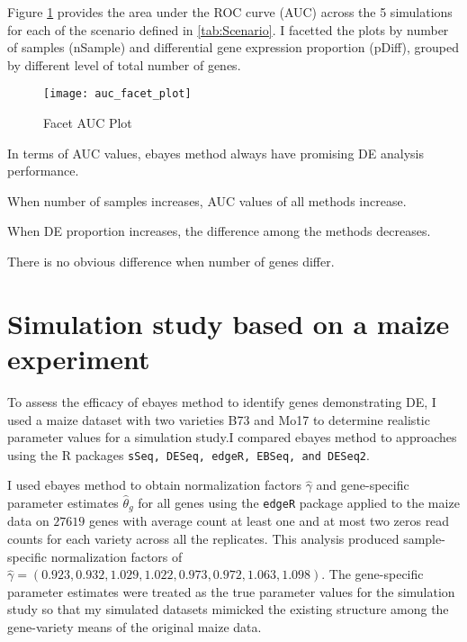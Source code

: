 Figure \ref{auc} provides the area under the ROC curve (AUC) across the 5 simulations for each of the scenario defined in \ref{tab:Scenario}. I facetted the plots by number of samples (nSample) and differential gene expression proportion (pDiff), grouped by different level of total number of genes. 

\begin{figure}[h!tb] 
\texttt{[image: auc\_facet\_plot]}
\caption{Facet AUC Plot}
\label{auc}
\end{figure}

In terms of AUC values, ebayes method always have promising DE analysis performance.

When number of samples increases, AUC values of all methods increase. 

When DE proportion increases, the difference among the methods decreases. 

There is no obvious difference when number of genes differ.











\section{Simulation study based on a maize experiment}

To assess the efficacy of ebayes method to identify genes demonstrating DE, I used a maize dataset with two varieties B73 and Mo17\citep{paschold2012complementation} to determine realistic parameter values for a simulation study.I compared ebayes method to approaches using the R packages {\tt sSeq, DESeq, edgeR, EBSeq, and DESeq2}.

I used ebayes method to obtain normalization factors $\hat{\gamma}$ and gene-specific parameter estimates $\hat{\theta}_g$ for all genes using the {\tt edgeR} package\citep{robinson2010edger} applied to the maize data\citep{paschold2012complementation} on $27619$ genes with average count at least one and at most two zeros read counts for each variety across all the replicates. This analysis produced sample-specific normalization factors of $\hat{\gamma} = (0.923, 0.932, 1.029, 1.022, 0.973, 0.972, 1.063, 1.098)$. The gene-specific parameter estimates were treated as the true parameter values for the simulation study so that my simulated datasets mimicked the existing structure among the gene-variety means of the original maize data.

